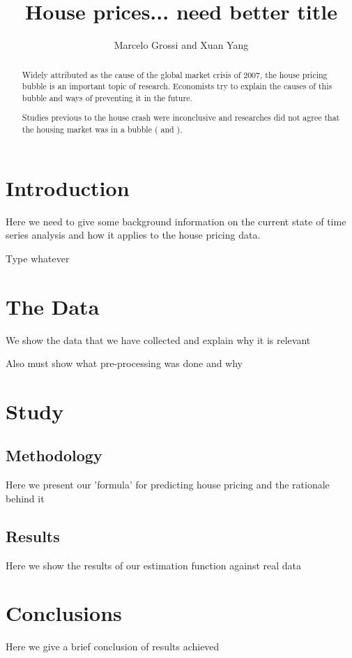 \documentclass{article}
\title{House prices... need better title}
\author{Marcelo Grossi and Xuan Yang}
\begin{document}
\maketitle
\begin{abstract}
Widely attributed as the cause of the global market crisis of 2007, the house pricing bubble is an important topic of research. Economists try to explain the causes of this bubble and ways of preventing it in the future.
\par
Studies previous to the house crash were inconclusive and researches did not agree that the housing market was in a bubble (\citep{unknown2010} and \citep{winter2003}).
\end{abstract}
\section{Introduction}
Here we need to give some background information on the current state of time series analysis and how it applies to the house pricing data.
\par
Type whatever
\section{The Data}
We show the data that we have collected and explain why it is relevant
\par
Also must show what pre-processing was done and why
\section{Study}
\subsection{Methodology}
Here we present our 'formula' for predicting house pricing and the rationale behind it
\subsection{Results}
Here we show the results of our estimation function against real data
\section{Conclusions}
Here we give a brief conclusion of results achieved

\end{document}
